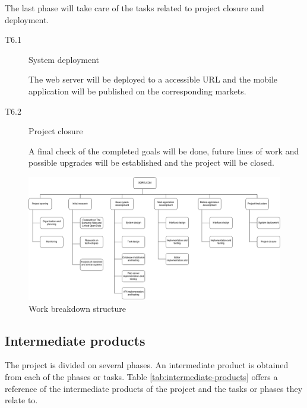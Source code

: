 The last phase will take care of the tasks related to project closure and deployment.

\begin{description}
\item[T6.1] System deployment

The web server will be deployed to a accessible URL and the mobile application will be published on the corresponding markets.

\item[T6.2] Project closure

A final check of the completed goals will be done, future lines of work and possible upgrades will be established and the project will be closed.
\end{description}

\begin{figure}[ht]
  \centering
  \includegraphics[angle=270, width=.5\textwidth]{fig/wbs}
  \caption{Work breakdown structure}
  \label{fig:wbs}
\end{figure} 

\subsection{Intermediate products}

The project is divided on several phases. An intermediate product is obtained from each of the phases or tasks. Table \ref{tab:intermediate-products} offers a reference of the intermediate products of the project and the tasks or phases they relate to.

